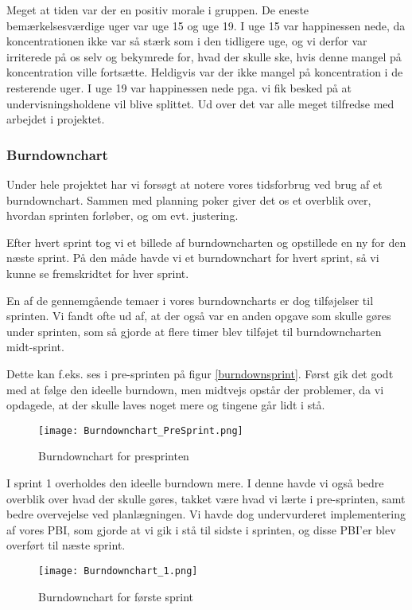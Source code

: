 Meget at tiden var der en positiv morale i gruppen.
De eneste bemærkelsesværdige uger var uge 15 og uge 19.
I uge 15 var happinessen nede, da koncentrationen ikke var så stærk som i den tidligere uge, og vi derfor var irriterede på os selv og bekymrede for, hvad der skulle ske, hvis denne mangel på koncentration ville fortsætte.
Heldigvis var der ikke mangel på koncentration i de resterende uger.
I uge 19 var happinessen nede pga. vi fik besked på at undervisningsholdene vil blive splittet.
Ud over det var alle meget tilfredse med arbejdet i projektet.

\subsubsection{Burndownchart}

Under hele projektet har vi forsøgt at notere vores tidsforbrug ved brug af et burndownchart.
Sammen med planning poker giver det os et overblik over, hvordan sprinten forløber, og om evt. justering. 

Efter hvert sprint tog vi et billede af burndowncharten og opstillede en ny for den næste sprint.
På den måde havde vi et burndownchart for hvert sprint, så vi kunne se fremskridtet for hver sprint.

En af de gennemgående temaer i vores burndowncharts er dog tilføjelser til sprinten.
Vi fandt ofte ud af, at der også var en anden opgave som skulle gøres under sprinten, som så gjorde at flere timer blev tilføjet til burndowncharten midt-sprint. 

Dette kan f.eks. ses i pre-sprinten på figur \ref{burndownsprint}.
Først gik det godt med at følge den ideelle burndown, men midtvejs opstår der problemer, da vi opdagede, at der skulle laves noget mere og tingene går lidt i stå.

\begin{figure}[h]
    \caption{Burndownchart for presprinten}
    \centering
        \texttt{[image: Burndownchart\_PreSprint.png]}
    \label{burndownpresprint}
\end{figure}

I sprint 1 overholdes den ideelle burndown mere.
I denne havde vi også bedre overblik over hvad der skulle gøres, takket være hvad vi lærte i pre-sprinten, samt bedre overvejelse ved planlægningen.
Vi havde dog undervurderet implementering af vores PBI, som gjorde at vi gik i stå til sidste i sprinten, og disse PBI'er blev overført til næste sprint.

\begin{figure}[h]
    \caption{Burndownchart for første sprint}
    \centering
        \texttt{[image: Burndownchart\_1.png]}
    \label{burndownfirstsprint}
\end{figure}

